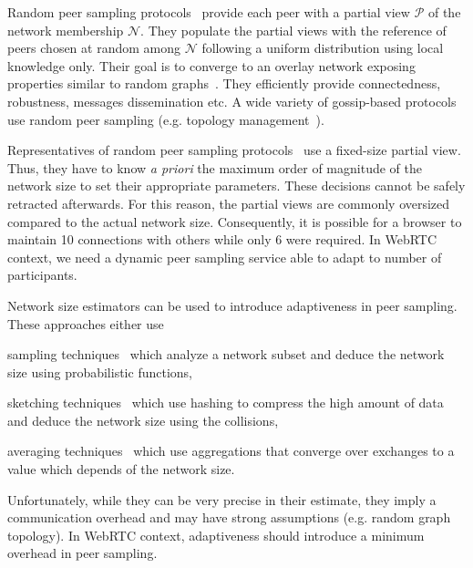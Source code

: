 Random peer sampling protocols~\cite{jelasity2004peer} provide each
peer with a partial view $\mathcal{P}$ of the network membership
$\mathcal{N}$. They populate the partial views with the reference of
peers chosen at random among $\mathcal{N}$ following a uniform
distribution using local knowledge only. Their goal is to converge to
an overlay network exposing properties similar to random
graphs~\cite{erdos1959random}. They efficiently provide connectedness,
robustness, messages dissemination etc. A wide variety of gossip-based
protocols use random peer sampling (e.g. topology
management~\cite{voulgaris2005epidemic, jelasity2009tman,
  dabek2004vivaldi}).

Representatives of random peer sampling
protocols~\cite{voulgaris2005cyclon, eugster2003lightweight,
  tolgyeski2009adaptive} use a fixed-size partial view.  Thus, they
have to know \emph{a priori} the maximum order of magnitude of the
network size to set their appropriate parameters. These decisions
cannot be safely retracted afterwards. For this reason, the partial
views are commonly oversized compared to the actual network
size. Consequently, it is possible for a browser to maintain 10
connections with others while only 6 were required. In WebRTC context,
we need a dynamic peer sampling service able to adapt to number of
participants.

Network size estimators can be used to introduce adaptiveness in peer
sampling. These approaches either use
\begin{inparaenum}[(i)]
\item sampling techniques~\cite{mane05network, ganesh2007peer,
    kostoulas2007active} which analyze a network subset and deduce the network
  size using probabilistic functions,
\item sketching techniques~\cite{flajolet2008hyperloglog, baquero2012extrema}
  which use hashing to compress the high amount of data and deduce the network
  size using the collisions,
\item averaging techniques~\cite{jelasity2004epidemic, blasa2011symmetric}
  which use aggregations that converge over exchanges to a value which depends
  of the network size.
\end{inparaenum}
Unfortunately, while they can be very precise in their estimate, they
imply a communication overhead and may have strong assumptions
(e.g. random graph topology). In WebRTC context, adaptiveness should
introduce a minimum overhead in peer sampling.

